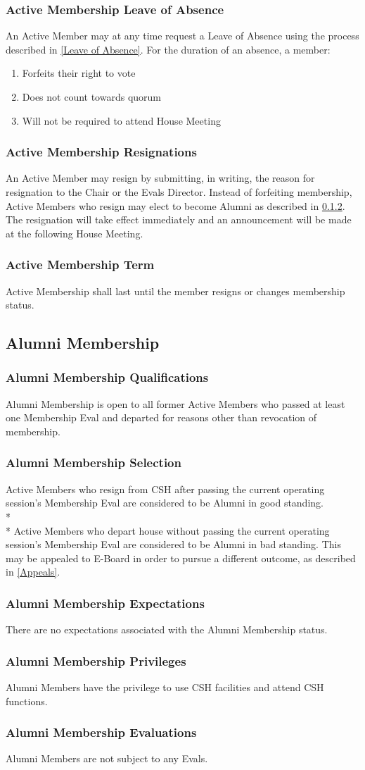 \documentclass{article}
\newcommand{\asection}[1]{\subsection{#1} \label{#1}}
\newcommand{\asubsection}[1]{\subsubsection{#1} \label{#1}}
\begin{document}
\asubsection{Active Membership Leave of Absence}
\renewcommand{\theenumi}{\alph{enumi}} %

An Active Member may at any time request a Leave of Absence using the process described in \ref{Leave of Absence}.
For the duration of an absence, a member:
\begin{enumerate}
	\item Forfeits their right to vote
	\item Does not count towards quorum
	\item Will not be required to attend House Meeting
\end{enumerate}

\asubsection{Active Membership Resignations}
An Active Member may resign by submitting, in writing, the reason for resignation to the Chair or the Evals Director.
Instead of forfeiting membership, Active Members who resign may elect to become Alumni as described in \ref{Alumni Membership Selection}.
The resignation will take effect immediately and an announcement will be made at the following House Meeting.

\asubsection{Active Membership Term}
Active Membership shall last until the member resigns or changes membership status.

\asection{Alumni Membership}

\asubsection{Alumni Membership Qualifications}
Alumni Membership is open to all former Active Members who passed at least one Membership Eval and departed for reasons other than revocation of membership.

\asubsection{Alumni Membership Selection}
Active Members who resign from CSH after passing the current operating session's Membership Eval are considered to be Alumni in good standing.
\\*\\*
Active Members who depart house without passing the current operating session's Membership Eval are considered to be Alumni in bad standing.
This may be appealed to E-Board in order to pursue a different outcome, as described in \ref{Appeals}.

\asubsection{Alumni Membership Expectations}
There are no expectations associated with the Alumni Membership status.

\asubsection{Alumni Membership Privileges}
Alumni Members have the privilege to use CSH facilities and attend CSH functions.

\asubsection{Alumni Membership Evaluations}
Alumni Members are not subject to any Evals.
\end{document}
